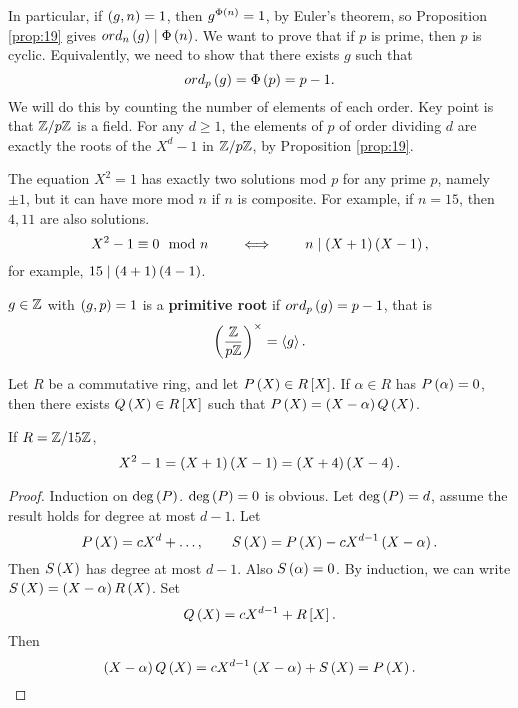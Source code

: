 In particular, if $ \left( g, n \right) = 1 $, then $ g^{\Phi\left( n \right)} = 1 $, by Euler's theorem, so Proposition \ref{prop:19} gives $ ord_n\left( g \right) \mid \Phi\left( n \right) $. We want to prove that if $ p $ is prime, then $ \unit{p} $ is cyclic. Equivalently, we need to show that there exists $ g $ such that
$$ ord_p\left( g \right) = \Phi\left( p \right) = p - 1. $$
We will do this by counting the number of elements of each order. Key point is that $ \mathbb{Z} / p\mathbb{Z} $ is a field. For any $ d \ge 1 $, the elements of $ \unit{p} $ of order dividing $ d $ are exactly the roots of the $ X^d - 1 $ in $ \mathbb{Z} / p\mathbb{Z} $, by Proposition \ref{prop:19}.

\begin{example*}
The equation $ X^2 = 1 $ has exactly two solutions mod $ p $ for any prime $ p $, namely $ \pm 1 $, but it can have more mod $ n $ if $ n $ is composite. For example, if $ n = 15 $, then $ 4, 11 $ are also solutions.
$$ X^2 - 1 \equiv 0 \mod n \qquad \iff \qquad n \mid \left( X + 1 \right)\left( X - 1 \right), $$
for example, $ 15 \mid \left( 4 + 1 \right)\left( 4 - 1 \right) $.
\end{example*}

\begin{definition}
$ g \in \mathbb{Z} $ with $ \left( g, p \right) = 1 $ is a \textbf{primitive root} if $ ord_p\left( g \right) = p - 1 $, that is
$$ \left( \dfrac{\mathbb{Z}}{p\mathbb{Z}} \right)^\times = \left\langle g \right\rangle. $$
\end{definition}

\begin{lemma}
\label{lem:21}
Let $ R $ be a commutative ring, and let $ P\left( X \right) \in R\left[ X \right] $. If $ \alpha \in R $ has $ P\left( \alpha \right) = 0 $, then there exists $ Q\left( X \right) \in R\left[ X \right] $ such that $ P\left( X \right) = \left( X - \alpha \right)Q\left( X \right) $.
\end{lemma}

\begin{example*}
If $ R = \mathbb{Z} / 15\mathbb{Z} $,
$$ X^2 - 1 = \left( X + 1 \right)\left( X - 1 \right) = \left( X + 4 \right)\left( X - 4 \right). $$
\end{example*}

\begin{proof}
Induction on $ \deg\left( P \right) $. $ \deg\left( P \right) = 0 $ is obvious. Let $ \deg\left( P \right) = d $, assume the result holds for degree at most $ d - 1 $. Let
$$ P\left( X \right) = cX^d + \dots, \qquad S\left( X \right) = P\left( X \right) - cX^{d - 1}\left( X - \alpha \right). $$
Then $ S\left( X \right) $ has degree at most $ d - 1 $. Also $ S\left( \alpha \right) = 0 $. By induction, we can write $ S\left( X \right) = \left( X - \alpha \right)R\left( X \right) $. Set
$$ Q\left( X \right) = cX^{d - 1} + R\left[ X \right]. $$
Then
$$ \left( X - \alpha \right)Q\left( X \right) = cX^{d - 1}\left( X - \alpha \right) + S\left( X \right) = P\left( X \right). $$
\end{proof}

